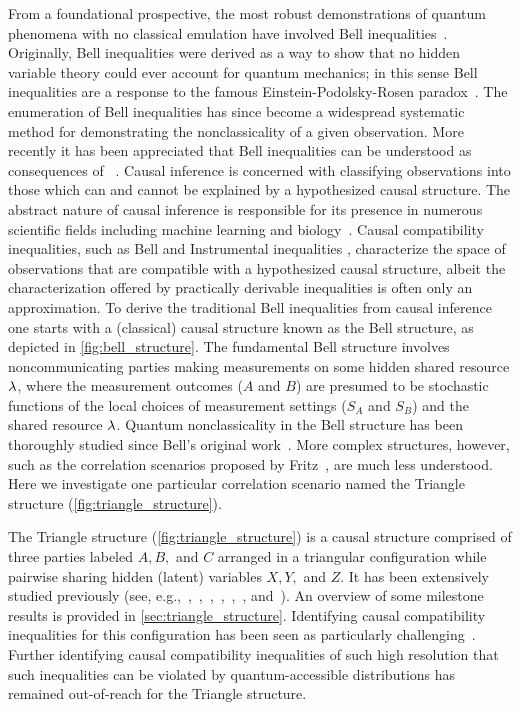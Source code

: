 \documentclass[aps, 10pt, english, twoside, pra, nofootinbib, tightenlines, longbibliography, superscriptaddress]{revtex4-1}
\begin{document}
    From a foundational prospective, the most robust demonstrations of quantum phenomena with no classical emulation have involved Bell inequalities~\cite{Bell_1964,Brunner_2013}. Originally, Bell inequalities were derived as a way to show that no hidden variable theory could ever account for quantum mechanics; in this sense Bell inequalities are a response to the famous Einstein-Podolsky-Rosen paradox~\cite{EPR_Orig}. The enumeration of Bell inequalities has since become a widespread systematic method for demonstrating the nonclassicality of a given observation. More recently it has been appreciated that Bell inequalities can be understood as consequences of ~\cite{Wood_2012}. Causal inference is concerned with classifying observations into those which can and cannot be explained by a hypothesized causal structure. The abstract nature of causal inference is responsible for its presence in numerous scientific fields including machine learning and biology~\cite{Pearl_2009,Pearl_2009_tr}. Causal compatibility inequalities, such as Bell and Instrumental inequalities \cite{pearl1995instrumental,bonet2001instrumental,evans2012graphical}, characterize the space of observations that are compatible with a hypothesized causal structure, albeit the characterization offered by practically derivable inequalities is often only an approximation. To derive the traditional Bell inequalities from causal inference one starts with a (classical) causal structure known as the Bell structure, as depicted in \cref{fig:bell_structure}. The fundamental Bell structure involves noncommunicating parties making measurements on some hidden shared resource $\lambda$, where the measurement outcomes ($A$ and $B$) are presumed to be stochastic functions of the local choices of measurement settings ($S_A$ and $S_B$) and the shared resource $\lambda$. Quantum nonclassicality in the Bell structure has been thoroughly studied since Bell's original work~\cite{Brunner_2013}. More complex structures, however, such as the correlation scenarios proposed by Fritz~\cite{Fritz_2012,Fritz_2014}, are much less understood. Here we investigate one particular correlation scenario named the Triangle structure (\cref{fig:triangle_structure}).

    The Triangle structure (\cref{fig:triangle_structure}) is a causal structure comprised of three parties labeled $A, B,$ and $C$ arranged in a triangular configuration while pairwise sharing hidden (latent) variables $X, Y,$ and $Z$. It has been extensively studied previously (see, e.g.,~\cite[Fig. 1]{Steudel_2010},~\cite[Fig. 6]{Chaves_2014},~\cite[Fig. 8]{Branciard_2012},~\cite[Fig. 8, App. E]{Henson_2014},~\cite[Fig. 3]{Fritz_2012},~\cite[Fig. 4]{Weilenmann_2016}, and~\cite[Fig. 1]{Inflation}). An overview of some milestone results is provided in \cref{sec:triangle_structure}. Identifying causal compatibility inequalities for this configuration has been seen as particularly challenging~\cite{Branciard_2012}. Further identifying causal compatibility inequalities of such high resolution that such inequalities can be violated by quantum-accessible distributions has remained out-of-reach for the Triangle structure.
\end{document}
